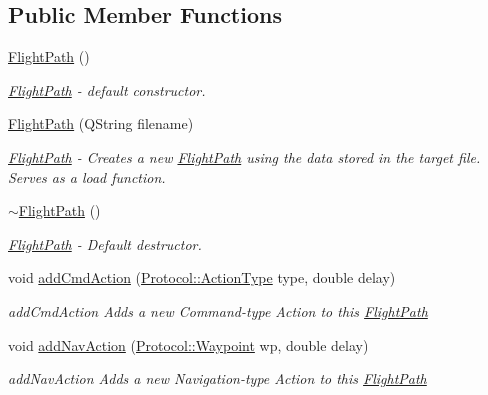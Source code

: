 \subsection*{Public Member Functions}
\begin{DoxyCompactItemize}
\item 
\hyperlink{class_flight_path_a2e628a23c9b4a92c238263cfa3d650d4}{Flight\+Path} ()
\begin{DoxyCompactList}\small\item\em \hyperlink{class_flight_path}{Flight\+Path} -\/ default constructor. \end{DoxyCompactList}\item 
\hyperlink{class_flight_path_a9be65ab000a34bf60862b8b1af77d43d}{Flight\+Path} (Q\+String filename)
\begin{DoxyCompactList}\small\item\em \hyperlink{class_flight_path}{Flight\+Path} -\/ Creates a new \hyperlink{class_flight_path}{Flight\+Path} using the data stored in the target file. Serves as a load function. \end{DoxyCompactList}\item 
\hyperlink{class_flight_path_a6fecfbdebe93de7d2b62e3a2048111ca}{$\sim$\+Flight\+Path} ()
\begin{DoxyCompactList}\small\item\em \hyperlink{class_flight_path}{Flight\+Path} -\/ Default destructor. \end{DoxyCompactList}\item 
void \hyperlink{class_flight_path_ab625d5c73d69a5e616dade72ddcffd49}{add\+Cmd\+Action} (\hyperlink{namespace_protocol_a95f2e35dc2d8d920f0d7ddaaf122c3b9}{Protocol\+::\+Action\+Type} type, double delay)
\begin{DoxyCompactList}\small\item\em add\+Cmd\+Action Adds a new Command-\/type Action to this \hyperlink{class_flight_path}{Flight\+Path} \end{DoxyCompactList}\item 
void \hyperlink{class_flight_path_a101c5c8e050e215d70e3c6218b935aa9}{add\+Nav\+Action} (\hyperlink{struct_protocol_1_1_waypoint}{Protocol\+::\+Waypoint} wp, double delay)
\begin{DoxyCompactList}\small\item\em add\+Nav\+Action Adds a new Navigation-\/type Action to this \hyperlink{class_flight_path}{Flight\+Path} \end{DoxyCompactList}\item 

\end{DoxyCompactItemize}
